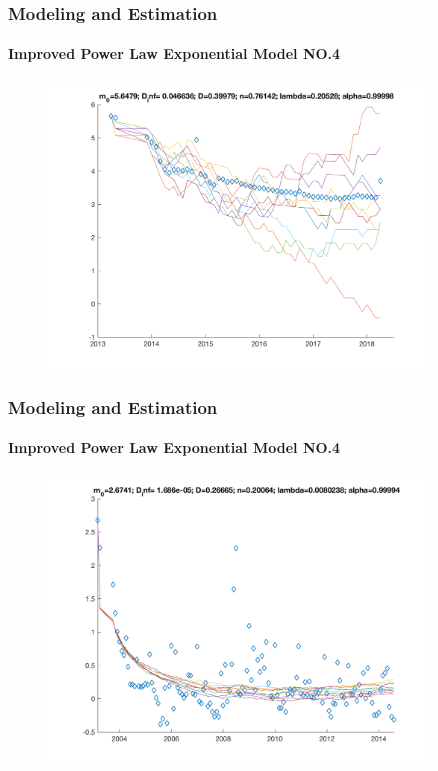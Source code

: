 \documentclass[11pt]{beamer}
\begin{document}
\begin{frame}
	\frametitle{Modeling and Estimation}
	\framesubtitle{Improved Power Law Exponential Model NO.4}
	\justifying
\begin{figure}
\begin{center}
\includegraphics[width=0.9\textwidth  ]{BBplot_87} 
\end{center}
\end{figure}				
\end{frame}	

\begin{frame}
	\frametitle{Modeling and Estimation}
	\framesubtitle{Improved Power Law Exponential Model NO.4}
	\justifying
\begin{figure}
\begin{center}
\includegraphics[width=0.9\textwidth  ]{BBplot_641} 
\end{center}
\end{figure}				
\end{frame}	
\end{document}
